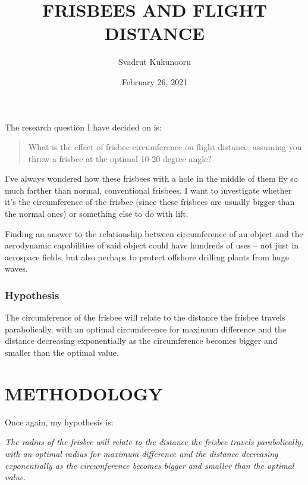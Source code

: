 \documentclass{article}
\title{FRISBEES AND FLIGHT
DISTANCE}
\author{Svadrut Kukunooru}
\date{February 26, 2021}
\begin{document}
\begin{titlepage}
    \maketitle
\end{titlepage}

The research question I have decided on is:

\begin{quote}
What is the effect of frisbee circumference on flight distance, assuming
you throw a frisbee at the optimal 10-20 degree angle?
\end{quote}

I've always wondered how these frisbees with a hole in the middle of
them fly so much farther than normal, conventional frisbees. I want to
investigate whether it's the circumference of the frisbee (since these
frisbees are usually bigger than the normal ones) or something else to
do with lift.

Finding an answer to the relationship between circumference of an object
and the aerodynamic capabilities of said object could have hundreds of
uses -- not just in aerospace fields, but also perhaps to protect
offshore drilling plants from huge waves.

\subsubsection{Hypothesis}\label{hypothesis}

The circumference of the frisbee will relate to the distance the frisbee
travels parabolically, with an optimal circumference for maximum
difference and the distance decreasing exponentially as the
circumference becomes bigger and smaller than the optimal value.

\section{METHODOLOGY}\label{methodology}

Once again, my hypothesis is:

\emph{The radius of the frisbee will relate to the distance the frisbee
travels parabolically, with an optimal radius for maximum difference and
the distance decreasing exponentially as the circumference becomes
bigger and smaller than the optimal value.}
\end{document}
